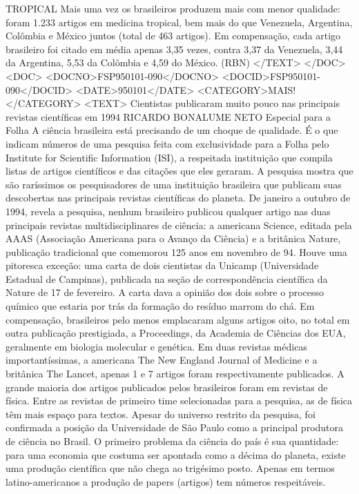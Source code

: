 TROPICAL 
Mais uma vez os brasileiros produzem mais com menor qualidade: foram 1.233 artigos em medicina tropical, bem mais do que Venezuela, Argentina, Colômbia e México juntos (total de 463 artigos). Em compensação, cada artigo brasileiro foi citado em média apenas 3,35 vezes, contra 3,37 da Venezuela, 3,44 da Argentina, 5,53 da Colômbia e 4,59 do México.
(RBN)
</TEXT>
</DOC>
<DOC>
<DOCNO>FSP950101-090</DOCNO>
<DOCID>FSP950101-090</DOCID>
<DATE>950101</DATE>
<CATEGORY>MAIS!</CATEGORY>
<TEXT>
Cientistas publicaram muito pouco nas principais revistas científicas em 1994 
RICARDO BONALUME NETO 
Especial para a Folha 
A ciência brasileira está precisando de um choque de qualidade. É o que indicam números de uma pesquisa feita com exclusividade para a Folha pelo  Institute for Scientific Information (ISI), a respeitada instituição que compila listas de artigos científicos e das citações que eles geraram.
A pesquisa mostra que são raríssimos os pesquisadores de uma instituição brasileira que publicam suas descobertas nas principais revistas científicas do planeta.
De janeiro a outubro de 1994, revela a pesquisa, nenhum brasileiro publicou qualquer artigo nas duas principais revistas multidisciplinares de ciência: a americana  Science, editada pela AAAS (Associação Americana para o Avanço da Ciência) e a britânica  Nature, publicação tradicional que comemorou 125 anos em novembro de 94.
Houve uma pitoresca exceção: uma carta de dois cientistas da Unicamp (Universidade Estadual de Campinas), publicada na seção de correspondência científica da  Nature de 17 de fevereiro.
A carta dava a opinião dos dois sobre o processo químico que estaria por trás da formação do resíduo marrom do chá.
Em compensação, brasileiros pelo menos emplacaram alguns artigos oito, no total em outra publicação prestigiada, a  Proceedings, da Academia de Ciências dos EUA, geralmente em biologia molecular e genética.
Em duas revistas médicas importantíssimas, a americana  The New England Journal of Medicine e a britânica  The Lancet, apenas 1 e 7 artigos foram respectivamente publicados.
A grande maioria dos artigos publicados pelos brasileiros foram em revistas de física. Entre as revistas de primeiro time selecionadas para a pesquisa, as de física têm mais espaço para textos.
Apesar do universo restrito da pesquisa, foi confirmada a posição da Universidade de São Paulo como a principal produtora de ciência no Brasil.
O primeiro problema da ciência do país é sua quantidade: para uma economia que costuma ser apontada como a décima do planeta, existe uma produção científica que não chega ao trigésimo posto. Apenas em termos latino-americanos a produção de  papers (artigos) tem números respeitáveis.
